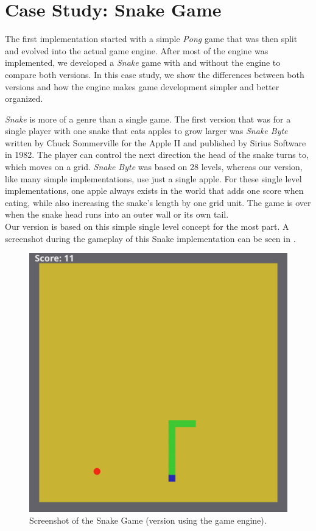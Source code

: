 \chapter{Case Study: Snake Game}\label{chap:casestudy}

The first implementation started with a simple \textit{Pong} game that was then split and evolved into the actual game engine. After most of the engine was implemented, we developed a \textit{Snake} game with and without the engine to compare both versions. In this case study, we show the differences between both versions and how the engine makes game development simpler and better organized.

\textit{Snake} is more of a genre than a single game. The first version that was for a single player with one snake that eats apples to grow larger was \textit{Snake Byte} written by Chuck Sommerville for the Apple II and published by Sirius Software in 1982. The player can control the next direction the head of the snake turns to, which moves on a grid. \textit{Snake Byte} was based on 28 levels, whereas our version, like many simple implementations, use just a single apple. For these single level implementations, one apple always exists in the world that adds one score when eating, while also increasing the snake's length by one grid unit. The game is over when the snake head runs into an outer wall or its own tail.\\
Our version is based on this simple single level concept for the most part. A screenshot during the gameplay of this Snake implementation can be seen in .

\begin{figure}[h!]
\centering
\includegraphics[width=\linewidth]{img/snake_screenshot.png}
\caption{Screenshot of the Snake Game (version using the game engine).}
\label{fig:snake}
\end{figure}

